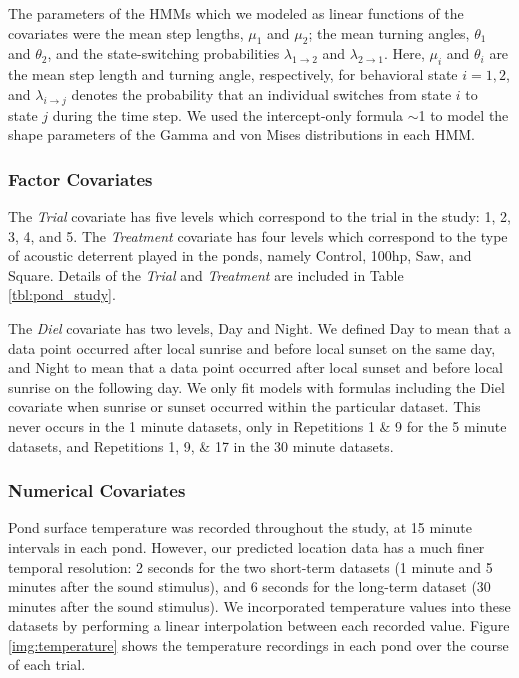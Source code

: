 \documentclass[12pt]{article}
\begin{document}
		The parameters of the HMMs which we modeled as linear functions of the covariates were the mean step lengths, $\mu_1$ and $\mu_2$; the mean turning angles, $\theta_1$ and $\theta_2$, and the state-switching probabilities $\lambda_{1 \to 2}$ and $\lambda_{2 \to 1}$. Here, $\mu_i$ and $\theta_i$ are the mean step length and turning angle, respectively, for behavioral state $i = 1, 2$, and $\lambda_{i \to j}$ denotes the probability that an individual switches from state $i$ to state $j$ during the time step. We used the intercept-only formula $\sim$1 to model the shape parameters of the Gamma and von Mises distributions in each HMM.
		
		\subsubsection{Factor Covariates}
		
			The \emph{Trial} covariate has five levels which correspond to the trial in the study: 1, 2, 3, 4, and 5. The \emph{Treatment} covariate has four levels which correspond to the type of acoustic deterrent played in the ponds, namely Control, 100hp, Saw, and Square. Details of the \emph{Trial} and \emph{Treatment} are included in Table \ref{tbl:pond_study}.
			
			The \emph{Diel} covariate has two levels, Day and Night. We defined Day to mean that a data point occurred after local sunrise and before local sunset on the same day, and Night to mean that a data point occurred after local sunset and before local sunrise on the following day. We only fit models with formulas including the Diel covariate when sunrise or sunset occurred within the particular dataset. This never occurs in the 1 minute datasets, only in Repetitions 1 \& 9 for the 5 minute datasets, and Repetitions 1, 9, \& 17 in the 30 minute datasets.
		
		\subsubsection{Numerical Covariates} \label{sec:num-cov}
		
			Pond surface temperature was recorded throughout the study, at 15 minute intervals in each pond. However, our predicted location data has a much finer temporal resolution: 2 seconds for the two short-term datasets (1 minute and 5 minutes after the sound stimulus), and 6 seconds for the long-term dataset (30 minutes after the sound stimulus). We incorporated temperature values into these datasets by performing a linear interpolation between each recorded value. Figure \ref{img:temperature} shows the temperature recordings in each pond over the course of each trial.
			
\end{document}
